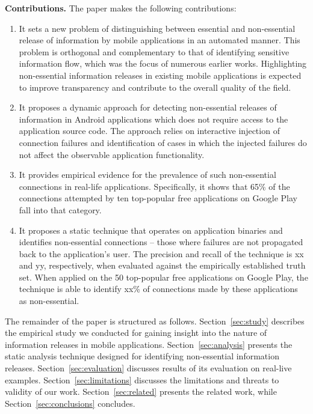 \vspace{0.1in}
\noindent 
{\bf Contributions.}
The paper makes the following contributions:
\begin{enumerate}
\item It sets a new problem of distinguishing between essential and non-essential release of information by mobile applications in an automated manner. This problem is orthogonal and complementary to that of identifying sensitive information flow, which was the focus of numerous earlier works. 
Highlighting non-essential information releases in existing mobile applications is expected to improve transparency and contribute to the overall quality of the field. 
\item It proposes a dynamic approach for detecting non-essential releases of information in Android applications which does not require access to the application source code. 
The approach relies on interactive injection of connection failures and identification of cases in which the injected failures do not affect the observable application functionality. 
\item It provides empirical evidence for the prevalence of such non-essential connections in real-life applications. Specifically, it shows that 65\% of the connections attempted by ten top-popular free applications on Google Play fall into that category.    
\item It proposes a static technique that operates on application binaries and identifies non-essential connections -- those where failures are not propagated back to the application's user. The precision and recall of the technique is xx and yy, respectively, when evaluated against the empirically established truth set. 
When applied on the 50 top-popular free applications on Google Play, the technique is able to identify xx\% of connections made by these applications as non-essential.
\end{enumerate}

The remainder of the paper is structured as follows. Section~\ref{sec:study} describes the empirical study we conducted for gaining insight into the nature of information releases in mobile applications. Section~\ref{sec:analysis} presents the static analysis technique designed for identifying non-essential information releases. 
Section~\ref{sec:evaluation} discusses results of its evaluation on real-live examples. Section~\ref{sec:limitations} discusses the limitations and threats to validity of our work. Section~\ref{sec:related} presents the related work, while Section~\ref{sec:conclusions} concludes. 



